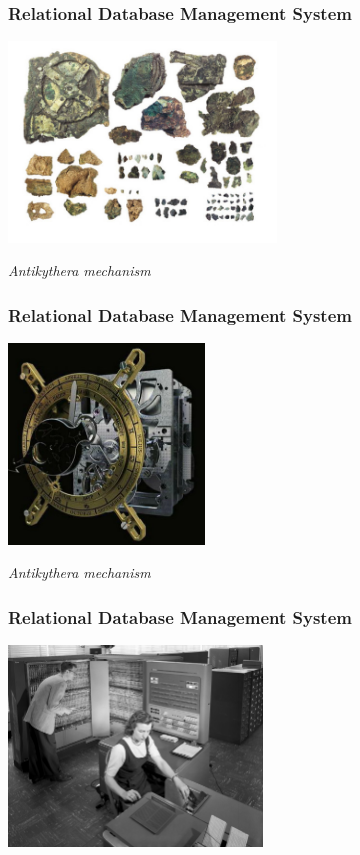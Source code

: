 \documentclass{beamer}
\begin{document}
\begin{frame}
  \frametitle{Relational Database Management System}

  \begin{center}
    \includegraphics[height=2.1in]{machine-d-Anticythere-c.jpg}
  \end{center}

  \vfill
  \begin{center}
    \textit{Antikythera mechanism}
  \end{center}
\end{frame}

\begin{frame}
  \frametitle{Relational Database Management System}

  \begin{center}
    \includegraphics[height=2.1in]{anticy6.jpg}
  \end{center}

  \vfill
  \begin{center}
    \textit{Antikythera mechanism}
  \end{center}
\end{frame}

\begin{frame}
  \frametitle{Relational Database Management System}

  \begin{center}
    \includegraphics[height=2.1in]{IBM_Electronic_Data_Processing_Machine_-_GPN-2000-001881.jpg}
  \end{center}
\end{frame}
\end{document}

